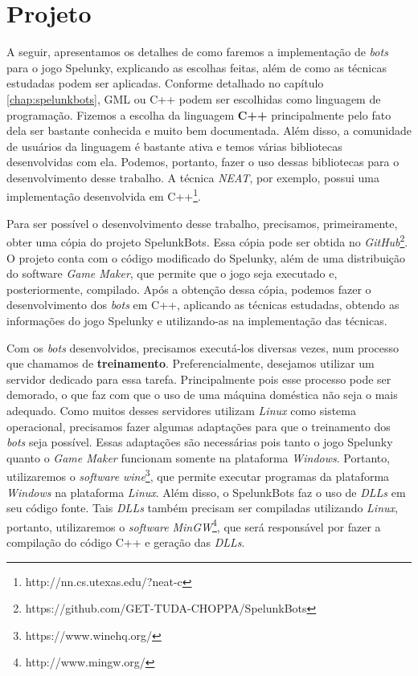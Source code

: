 \chapter{\label{chap:project}Projeto}

A seguir, apresentamos os detalhes de como faremos a implementação de
\textit{bots} para o jogo Spelunky, explicando as escolhas feitas, além de como
as técnicas estudadas podem ser aplicadas. Conforme detalhado no capítulo
\ref{chap:spelunkbots}, GML ou C++ podem ser escolhidas como linguagem de
programação. Fizemos a escolha da linguagem \textbf{C++} principalmente pelo
fato dela ser bastante conhecida e muito bem documentada. Além disso, a
comunidade de usuários da linguagem é bastante ativa e temos várias bibliotecas
desenvolvidas com ela. Podemos, portanto, fazer o uso dessas bibliotecas para o
desenvolvimento desse trabalho. A técnica \textit{NEAT}, por exemplo, possui uma
implementação desenvolvida em C++\footnote{http://nn.cs.utexas.edu/?neat-c}.

Para ser possível o desenvolvimento desse trabalho, precisamos, primeiramente,
obter uma cópia do projeto SpelunkBots. Essa cópia pode ser obtida no
\textit{GitHub}\footnote{https://github.com/GET-TUDA-CHOPPA/SpelunkBots}. O
projeto conta com o código modificado do Spelunky, além de uma distribuição do
software \textit{Game Maker}, que permite que o jogo seja executado e,
posteriormente, compilado. Após a obtenção dessa cópia, podemos fazer o
desenvolvimento dos \textit{bots} em C++, aplicando as técnicas estudadas,
obtendo as informações do jogo Spelunky e utilizando-as na implementação das
técnicas.

Com os \textit{bots} desenvolvidos, precisamos executá-los diversas vezes, num
processo que chamamos de \textbf{treinamento}.  Preferencialmente, desejamos
utilizar um servidor dedicado para essa tarefa.  Principalmente pois esse
processo pode ser demorado, o que faz com que o uso de uma máquina doméstica
não seja o mais adequado. Como muitos desses servidores utilizam \textit{Linux}
como sistema operacional, precisamos fazer algumas adaptações para que o
treinamento dos \textit{bots} seja possível. Essas adaptações são necessárias
pois tanto o jogo Spelunky quanto o \textit{Game Maker} funcionam somente na
plataforma \textit{Windows}.  Portanto, utilizaremos o \textit{software}
\textit{wine}\footnote{https://www.winehq.org/}, que permite executar programas
da plataforma \textit{Windows} na plataforma \textit{Linux}.  Além disso, o
SpelunkBots faz o uso de \textit{DLLs} em seu código fonte. Tais \textit{DLLs}
também precisam ser compiladas utilizando \textit{Linux}, portanto,
utilizaremos o \textit{software}
\textit{MinGW}\footnote{http://www.mingw.org/}, que será responsável por fazer
a compilação do código C++ e geração das \textit{DLLs}.
